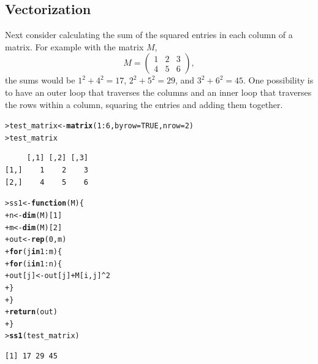 \documentclass[12pt,oneside]{book}\usepackage[]{graphicx}\usepackage[]{color}
\makeatletter
\newcommand{\hlnum}[1]{\textcolor[rgb]{0.686,0.059,0.569}{#1}}%
\newcommand{\hlopt}[1]{\textcolor[rgb]{0,0,0}{#1}}%
\newcommand{\hlstd}[1]{\textcolor[rgb]{0.345,0.345,0.345}{#1}}%
\newcommand{\hlkwa}[1]{\textcolor[rgb]{0.161,0.373,0.58}{\textbf{#1}}}%
\newcommand{\hlkwb}[1]{\textcolor[rgb]{0.69,0.353,0.396}{#1}}%
\newcommand{\hlkwc}[1]{\textcolor[rgb]{0.333,0.667,0.333}{#1}}%
\newcommand{\hlkwd}[1]{\textcolor[rgb]{0.737,0.353,0.396}{\textbf{#1}}}%
\newenvironment{kframe}{%
 \def\at@end@of@kframe{}%
 \ifinner\ifhmode%
  \def\at@end@of@kframe{\end{minipage}}%
  \begin{minipage}{\columnwidth}%
 \fi\fi%
 \def\FrameCommand##1{\hskip\@totalleftmargin \hskip-\fboxsep
 \colorbox{shadecolor}{##1}\hskip-\fboxsep
     \hskip-\linewidth \hskip-\@totalleftmargin \hskip\columnwidth}%
 \MakeFramed {\advance\hsize-\width
   \@totalleftmargin\z@ \linewidth\hsize
   \@setminipage}}%
 {\par\unskip\endMakeFramed%
 \at@end@of@kframe}
\newenvironment{knitrout}{}{} %
\makeatother
\begin{document}
\subsection{Vectorization}%
Next consider calculating the sum of the squared entries in each column of a matrix. For example with the matrix $M$,
\[
M = \left(\begin{array}{ccc}
1 & 2 & 3 \\
4 & 5 & 6
\end{array}\right),
\]
the sums would be $1^2 + 4^2 = 17$, $2^2 + 5^2 = 29$, and $3^2 + 6^2 = 45$. 
One possibility is to have an outer loop that traverses the columns and an inner loop that traverses the rows within a column, squaring the entries and adding them together.
\begin{knitrout}
\color{fgcolor}\begin{kframe}
\begin{alltt}
\hlstd{> }\hlstd{test_matrix} \hlkwb{<-} \hlkwd{matrix}\hlstd{(}\hlnum{1}\hlopt{:}\hlnum{6}\hlstd{,} \hlkwc{byrow} \hlstd{=} \hlnum{TRUE}\hlstd{,} \hlkwc{nrow} \hlstd{=} \hlnum{2}\hlstd{)}
\hlstd{> }\hlstd{test_matrix}
\end{alltt}
\begin{verbatim}
     [,1] [,2] [,3]
[1,]    1    2    3
[2,]    4    5    6
\end{verbatim}
\begin{alltt}
\hlstd{> }\hlstd{ss1} \hlkwb{<-} \hlkwa{function}\hlstd{(}\hlkwc{M}\hlstd{) \{}
\hlstd{+ }    \hlstd{n} \hlkwb{<-} \hlkwd{dim}\hlstd{(M)[}\hlnum{1}\hlstd{]}
\hlstd{+ }    \hlstd{m} \hlkwb{<-} \hlkwd{dim}\hlstd{(M)[}\hlnum{2}\hlstd{]}
\hlstd{+ }    \hlstd{out} \hlkwb{<-} \hlkwd{rep}\hlstd{(}\hlnum{0}\hlstd{, m)}
\hlstd{+ }    \hlkwa{for} \hlstd{(j} \hlkwa{in} \hlnum{1}\hlopt{:}\hlstd{m) \{}
\hlstd{+ }        \hlkwa{for} \hlstd{(i} \hlkwa{in} \hlnum{1}\hlopt{:}\hlstd{n) \{}
\hlstd{+ }            \hlstd{out[j]} \hlkwb{<-} \hlstd{out[j]} \hlopt{+} \hlstd{M[i, j]}\hlopt{^}\hlnum{2}
\hlstd{+ }        \hlstd{\}}
\hlstd{+ }    \hlstd{\}}
\hlstd{+ }    \hlkwd{return}\hlstd{(out)}
\hlstd{+ }\hlstd{\}}
\hlstd{> }\hlkwd{ss1}\hlstd{(test_matrix)}
\end{alltt}
\begin{verbatim}
[1] 17 29 45
\end{verbatim}
\end{kframe}
\end{knitrout}
\end{document}
